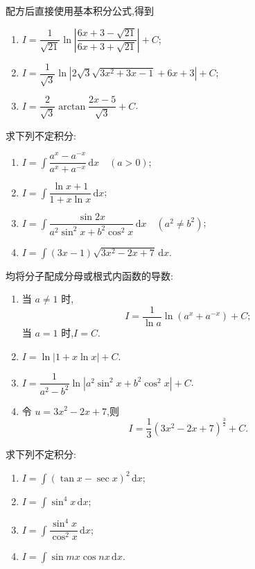 \begin{solution}
    配方后直接使用基本积分公式,得到
    \begin{enumerate}
        \item $\displaystyle I=\dfrac{1}{\sqrt{21}}\ln\left|\dfrac{6x+3-\sqrt{21}}{6x+3+\sqrt{21}}\right|+C$;
        \item $\displaystyle I=\dfrac{1}{\sqrt3}\ln\left|2\sqrt3\sqrt{3x^2+3x-1}+6x+3\right|+C$;
        \item $\displaystyle I=\dfrac{2}{\sqrt3}\arctan\dfrac{2x-5}{\sqrt3}+C$.
    \end{enumerate}
\end{solution}

\begin{example}
    求下列不定积分:
    \begin{enumerate}
        \item $\displaystyle I=\int\dfrac{a^x-a^{-x}}{a^x+a^{-x}}\,\mathrm{d}x\quad(a>0)$;
        \item $\displaystyle I=\int\dfrac{\ln x+1}{1+x\ln x}\,\mathrm{d}x$;
        \item $\displaystyle I=\int\dfrac{\sin2x}{a^2\sin^2x+b^2\cos^2x}\,\mathrm{d}x\quad(a^2\neq b^2)$;
        \item $\displaystyle I=\int(3x-1)\sqrt{3x^2-2x+7}\,\mathrm{d}x$.
    \end{enumerate}
\end{example}
\exampleblank

\begin{solution}
    均将分子配成分母或根式内函数的导数:
    \begin{enumerate}
        \item 当 $a\neq1$ 时,
              \[
                  I=\dfrac{1}{\ln a}\ln(a^x+a^{-x})+C;
              \]
              当 $a=1$ 时,$I=C$.
        \item $\displaystyle I=\ln|1+x\ln x|+C$.
        \item $\displaystyle I=\dfrac{1}{a^2-b^2}\ln|a^2\sin^2x+b^2\cos^2x|+C$.
        \item 令 $u=3x^2-2x+7$,则
              \[
                  I=\dfrac{1}{3}(3x^2-2x+7)^{\frac{3}{2}}+C.
              \]
    \end{enumerate}
\end{solution}

\begin{example}
    求下列不定积分:
    \begin{enumerate}
        \item $\displaystyle I=\int(\tan x-\sec x)^2\,\mathrm{d}x$;
        \item $\displaystyle I=\int\sin^4x\,\mathrm{d}x$;
        \item $\displaystyle I=\int\dfrac{\sin^4x}{\cos^2x}\,\mathrm{d}x$;
        \item $\displaystyle I=\int\sin mx\cos nx\,\mathrm{d}x$.
    \end{enumerate}
\end{example}
\exampleblank

